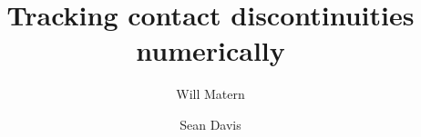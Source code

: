 \documentclass{article}
\begin{document}
\title{Tracking contact discontinuities numerically}
\author{Will Matern \and Sean Davis}
\maketitle
\end{document}

